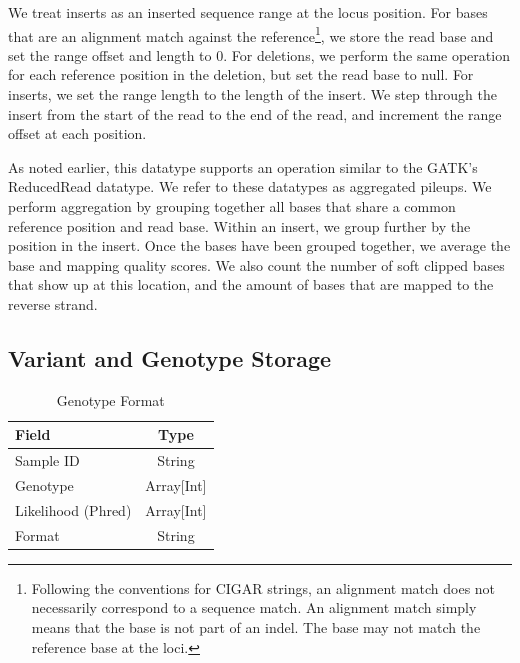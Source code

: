 \documentclass[10pt,twocolumn]{article}
\begin{document}
We treat inserts as an inserted sequence range at the locus position. For bases that are an alignment match against the
reference\footnote{Following the conventions for CIGAR strings, an alignment match does not necessarily correspond to
a sequence match. An alignment match simply means that the base is not part of an indel. The base may not match the
reference base at the loci.}, we store the read base and set the range offset and length to 0. For deletions, we perform the
same operation for each reference position in the deletion, but set the read base to null. For inserts, we set the range length
to the length of the insert. We step through the insert from the start of the read to the end of the read, and increment the
range offset at each position.

As noted earlier, this datatype supports an operation similar to the GATK's ReducedRead datatype. We refer to these datatypes
as aggregated pileups. We perform aggregation by grouping together all bases that share a common reference position and
read base. Within an insert, we group further by the position in the insert. Once the bases have been grouped together, we average
the base and mapping quality scores. We also count the number of soft clipped bases that show up at this location, and the amount
of bases that are mapped to the reverse strand.

\subsection{Variant and Genotype Storage}
\label{sec:variant-and-genotype-storage}

\begin{table}[h]
\caption{Genotype Format}
\label{tab:genotype-format}
\begin{center}
\begin{tabular}{| l | c |}
\hline
\bf Field & \bf Type \\
\hline
Sample ID & String \\
Genotype & Array[Int] \\
Likelihood (Phred) & Array[Int] \\
Format & String \\
\hline
\end{tabular}
\end{center}
\end{table}
\end{document}
